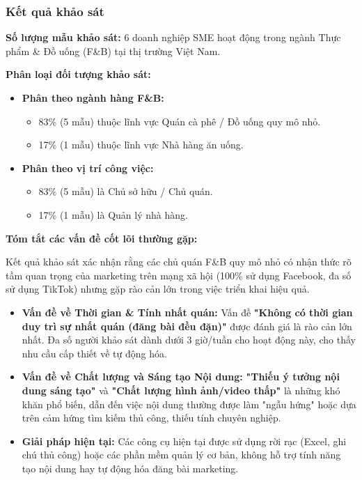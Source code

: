 \subsubsection{Kết quả khảo
sát}\label{kux1ebft-quux1ea3-khux1ea3o-suxe1t}

\textbf{Số lượng mẫu khảo sát:} 6 doanh nghiệp SME hoạt động trong ngành
Thực phẩm \& Đồ uống (F\&B) tại thị trường Việt Nam.

\textbf{Phân loại đối tượng khảo sát:}

\begin{itemize}
\item
  \textbf{Phân theo ngành hàng F\&B:}

  \begin{itemize}
  \item
    83\% (5 mẫu) thuộc lĩnh vực Quán cà phê / Đồ uống quy mô nhỏ.
  \item
    17\% (1 mẫu) thuộc lĩnh vực Nhà hàng ăn uống.
  \end{itemize}
\item
  \textbf{Phân theo vị trí công việc:}

  \begin{itemize}
  \item
    83\% (5 mẫu) là Chủ sở hữu / Chủ quán.
  \item
    17\% (1 mẫu) là Quản lý nhà hàng.
  \end{itemize}
\end{itemize}

\textbf{Tóm tắt các vấn đề cốt lõi thường gặp:}

Kết quả khảo sát xác nhận rằng các chủ quán F\&B quy mô nhỏ có nhận thức
rõ tầm quan trọng của marketing trên mạng xã hội (100\% sử dụng
Facebook, đa số sử dụng TikTok) nhưng gặp rào cản lớn trong việc triển
khai hiệu quả.

\begin{itemize}
\item
  \textbf{Vấn đề về Thời gian \& Tính nhất quán:} Vấn đề \textbf{"Không
  có thời gian duy trì sự nhất quán (đăng bài đều đặn)"} được đánh giá
  là rào cản lớn nhất. Đa số người khảo sát dành dưới 3 giờ/tuần cho
  hoạt động này, cho thấy nhu cầu cấp thiết về tự động hóa.
\item
  \textbf{Vấn đề về Chất lượng và Sáng tạo Nội dung:} \textbf{"Thiếu ý
  tưởng nội dung sáng tạo"} và \textbf{"Chất lượng hình ảnh/video thấp"}
  là những khó khăn phổ biến, dẫn đến việc nội dung thường được làm
  "ngẫu hứng" hoặc dựa trên cảm hứng tìm kiếm thủ công, thiếu tính
  chuyên nghiệp.
\item
  \textbf{Giải pháp hiện tại:} Các công cụ hiện tại được sử dụng rời rạc
  (Excel, ghi chú thủ công) hoặc các phần mềm quản lý cơ bản, không hỗ
  trợ tính năng tạo nội dung hay tự động hóa đăng bài marketing.
\end{itemize}

